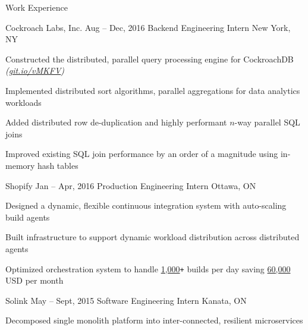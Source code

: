 \documentclass{resume} %
\begin{document}
\begin{rSection}{Work Experience}
  \begin{rSubsection}{Cockroach Labs, Inc.}
                     {Aug -- Dec, 2016}
                     {Backend Engineering Intern}
                     {New York, NY}

    \item Constructed the distributed, parallel query processing engine for
      CockroachDB {\em (\href{https://git.io/vMKFV}{git.io/vMKFV})}
    \item Implemented distributed sort algorithms, parallel aggregations for
      data analytics workloads
    \item Added distributed row de-duplication and highly performant $n$-way
      parallel SQL joins
    \item Improved existing SQL join performance by an order of a magnitude
      using in-memory hash tables
  \end{rSubsection}

  \begin{rSubsection}{Shopify}
                     {Jan -- Apr, 2016}
                     {Production Engineering Intern}
                     {Ottawa, ON}

  \item Designed a dynamic, flexible continuous integration system with
    auto-scaling build agents
  \item Built infrastructure to support dynamic workload distribution across
    distributed agents
  \item Optimized orchestration system to handle \underline{1,000}\texttt{+} builds per
    day saving \underline{60,000} USD per month
  \end{rSubsection}

  \begin{rSubsection}{Solink}
                     {May -- Sept, 2015}
                     {Software Engineering Intern}
                     {Kanata, ON}

    \item Decomposed single monolith platform into inter-connected, resilient
      microservices
  \end{rSubsection}
\end{rSection}

\end{document}

